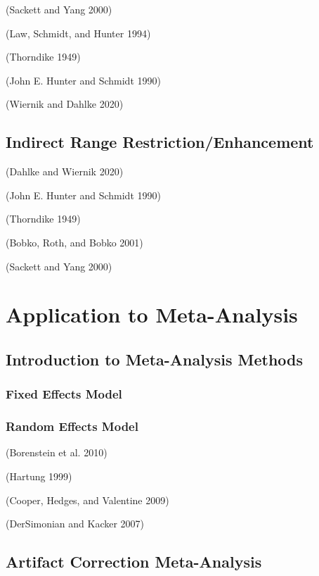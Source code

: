 \documentclass[
  letterpaper,
  DIV=11,
  numbers=noendperiod]{scrreprt}
\begin{document}
(Sackett and Yang 2000)

(Law, Schmidt, and Hunter 1994)

(Thorndike 1949)

(John E. Hunter and Schmidt 1990)

(Wiernik and Dahlke 2020)

\hypertarget{indirect-range-restrictionenhancement}{%
\chapter{Indirect Range
Restriction/Enhancement}\label{indirect-range-restrictionenhancement}}

(Dahlke and Wiernik 2020)

(John E. Hunter and Schmidt 1990)

(Thorndike 1949)

(Bobko, Roth, and Bobko 2001)

(Sackett and Yang 2000)

\part{Application to Meta-Analysis}

\hypertarget{introduction-to-meta-analysis-methods}{%
\chapter{Introduction to Meta-Analysis
Methods}\label{introduction-to-meta-analysis-methods}}

\hypertarget{fixed-effects-model}{%
\section{Fixed Effects Model}\label{fixed-effects-model}}

\hypertarget{random-effects-model}{%
\section{Random Effects Model}\label{random-effects-model}}

(Borenstein et al. 2010)

(Hartung 1999)

(Cooper, Hedges, and Valentine 2009)

(DerSimonian and Kacker 2007)

\hypertarget{artifact-correction-meta-analysis}{%
\chapter{Artifact Correction
Meta-Analysis}\label{artifact-correction-meta-analysis}}
\end{document}
